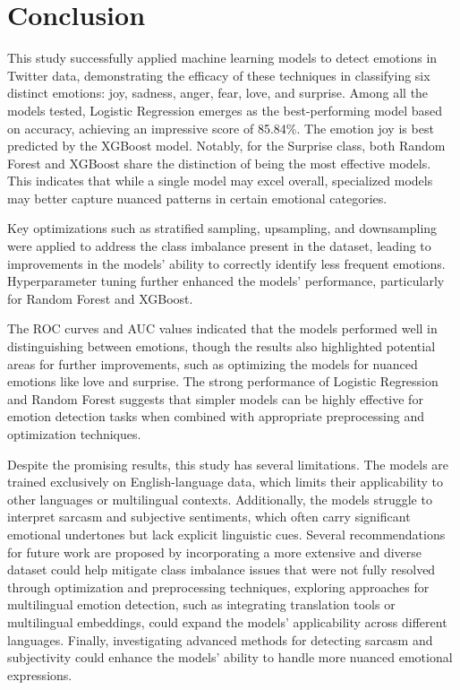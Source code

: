 

\section{Conclusion}

This study successfully applied machine learning models to detect emotions in Twitter data, demonstrating the efficacy of these techniques in classifying six distinct emotions: joy, sadness, anger, fear, love, and surprise. Among all the models tested, Logistic Regression emerges as the best-performing model based on accuracy, achieving an impressive score of 85.84\%. The emotion joy is best predicted by the XGBoost model. Notably, for the Surprise class, both Random Forest and XGBoost share the distinction of being the most effective models. This indicates that while a single model may excel overall, specialized models may better capture nuanced patterns in certain emotional categories. 

Key optimizations such as stratified sampling, upsampling, and downsampling were applied to address the class imbalance present in the dataset, leading to improvements in the models' ability to correctly identify less frequent emotions. Hyperparameter tuning further enhanced the models' performance, particularly for Random Forest and XGBoost.

The ROC curves and AUC values indicated that the models performed well in distinguishing between emotions, though the results also highlighted potential areas for further improvements, such as optimizing the models for nuanced emotions like love and surprise. The strong performance of Logistic Regression and Random Forest suggests that simpler models can be highly effective for emotion detection tasks when combined with appropriate preprocessing and optimization techniques.

Despite the promising results, this study has several limitations. The models are trained exclusively on English-language data, which limits their applicability to other languages or multilingual contexts. Additionally, the models struggle to interpret sarcasm and subjective sentiments, which often carry significant emotional undertones but lack explicit linguistic cues. Several recommendations for future work are proposed by incorporating a more extensive and diverse dataset could help mitigate class imbalance issues that were not fully resolved through optimization and preprocessing techniques, exploring approaches for multilingual emotion detection, such as integrating translation tools or multilingual embeddings, could expand the models' applicability across different languages. Finally, investigating advanced methods for detecting sarcasm and subjectivity could enhance the models' ability to handle more nuanced emotional expressions.